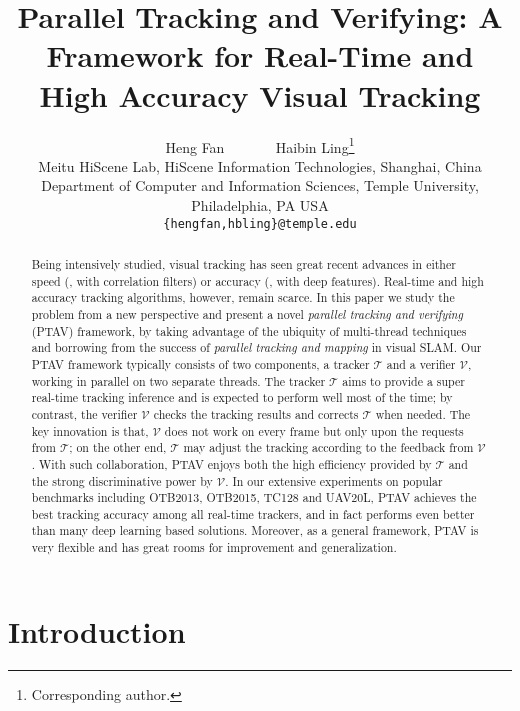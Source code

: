 \documentclass[10pt,twocolumn,letterpaper]{article}
\def \TRK{\mathcal{T}}
\def \VRF{\mathcal{V}}
\begin{document}
\title{Parallel Tracking and Verifying: A Framework for Real-Time and High Accuracy Visual Tracking}

\author{Heng Fan ~~~~~~   Haibin Ling\thanks{Corresponding author.}\\
    \normalsize Meitu HiScene Lab, HiScene Information Technologies, Shanghai, China\\
    \normalsize Department of Computer and Information Sciences, Temple University, Philadelphia, PA USA\\
{\tt\small \{hengfan,hbling\}@temple.edu}
}

\maketitle


%
\begin{abstract}
Being intensively studied, visual tracking has seen great recent advances in either speed (\eg, with correlation filters) or accuracy (\eg, with deep features). Real-time and high accuracy tracking algorithms, however, remain scarce. In this paper we study the problem from a new perspective and present a novel \emph{parallel tracking and verifying} (PTAV) framework, by taking advantage of the ubiquity of multi-thread techniques and borrowing from the success of \emph{parallel tracking and mapping} in visual SLAM. Our PTAV framework typically consists of two components, a tracker $\TRK$ and a verifier $\VRF$, working in parallel on two separate threads. The tracker $\TRK$ aims to provide a super real-time tracking inference and is expected to perform well most of the time; by contrast, the verifier $\VRF$ checks the tracking results and corrects $\TRK$ when needed. The key innovation is that, $\VRF$ does not work on every frame but only upon the requests from $\TRK$; on the other end, $\TRK$ may adjust the tracking according to the feedback from $\VRF$. With such collaboration, PTAV enjoys both the high efficiency provided by $\TRK$ and the strong discriminative power by $\VRF$. In our extensive experiments on popular benchmarks including OTB2013, OTB2015, TC128 and UAV20L, PTAV achieves the best tracking accuracy among all real-time trackers, and in fact performs even better than many deep learning based solutions. Moreover, as a general framework, PTAV is very flexible and has great rooms for improvement and generalization.
\end{abstract}

\section{Introduction}
\end{document}
